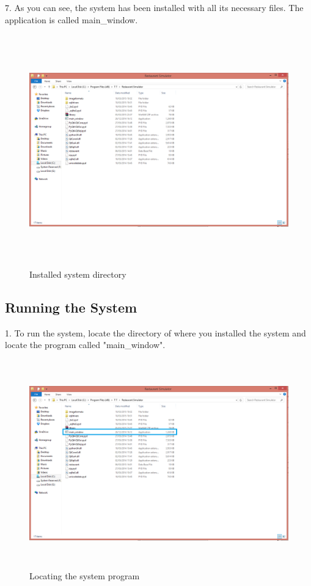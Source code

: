 \begin{landscape}
7. As you can see, the system has been installed with all its necessary files. The application is called main\_window.

\begin{figure}[H]
    \includegraphics[height = 10cm]{./Manual/images/install7} 
    \caption{Installed system directory} \label{fig:install7}
\end{figure}


\subsection{Running the System}

1. To run the system, locate the directory of where you installed the system and locate the program called "main\_window". 

\begin{figure}[H]
    \includegraphics[height = 9cm]{./Manual/images/runsystem} 
    \caption{Locating the system program} \label{fig:locateSystem}
\end{figure}


\end{landscape}
